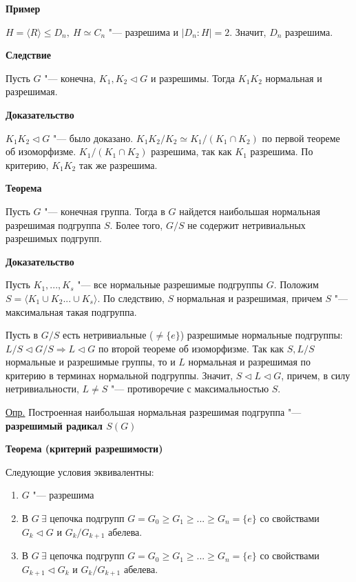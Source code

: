 \documentclass{article}
\begin{document}
\vspace{5pt}
	
\textbf{Пример}
	
$H = \langle R \rangle \leq D_n, \  H \simeq C_n$ "--- разрешима и $|D_n:H| = 2$. Значит, $D_n$ разрешима.
	
\vspace{10pt}
	
\textbf{Следствие}
	
Пусть $G$ "--- конечна, $K_1, K_2 \triangleleft G$ и разрешимы. Тогда $K_1K_2$ нормальная и разрешимая.
	
\textbf{Доказательство}
	
$K_1K_2 \triangleleft G$ "--- было доказано. $K_1K_2/K_2 \simeq K_1/(K_1 \cap K_2)$ по первой теореме об изоморфизме. $K_1/(K_1 \cap K_2)$ разрешима, так как $K_1$ разрешима. По критерию, $K_1K_2$ так же разрешима.
	
\vspace{10pt}
	
\textbf{Теорема}
	
Пусть $G$ "--- конечная группа. Тогда в $G$ найдется наибольшая нормальная разрешимая подгруппа $S$. Более того, $G/S$ не содержит нетривиальных разрешимых подгрупп.
	
\textbf{Доказательство}
	
Пусть $K_1, ... , K_s$ "--- все нормальные разрешимые подгруппы $G$. Положим $S = \langle K_1 \cup K_2 ... \cup K_s \rangle$. По следствию, $S$ нормальная и разрешимая, причем $S$ "--- максимальная такая подгруппа.
	
Пусть в $G/S$ есть нетривиальные ($\neq \{e\}$) разрешимые нормальные подгруппы: $L/S \triangleleft G/S \Rightarrow L \triangleleft G$ по второй теореме об изоморфизме. Так как $S, L/S$ нормальные и разрешимые группы, то и $L$ нормальная и разрешимая по критерию в терминах нормальной подгруппы. Значит, $S \triangleleft L \triangleleft G$, причем, в силу нетривиальности, $L \neq S$ "--- противоречие с максимальностью $S$.
	
\vspace{10pt}
	
\underline{Опр.} Построенная наибольшая нормальная разрешимая подгруппа "--- \textbf{разрешимый радикал $S(G)$}
	
\vspace{5pt}
	
\textbf{Теорема (критерий разрешимости)}
	
Следующие условия эквивалентны:
\begin{enumerate}
	\item $G$ "--- разрешима
	\item В $G \  \exists$ цепочка подгрупп $G = G_0 \geq G_1 \geq ... \geq G_n = \{e\}$ со свойствами $G_k \triangleleft G$ и $G_{k}/G_{k+1}$ абелева.
	\item В $G \  \exists$ цепочка подгрупп $G = G_0 \geq G_1 \geq ... \geq G_n = \{e\}$ со свойствами $G_{k+1} \triangleleft G_k$ и $G_{k}/G_{k+1}$ абелева.
\end{enumerate}
\end{document}
